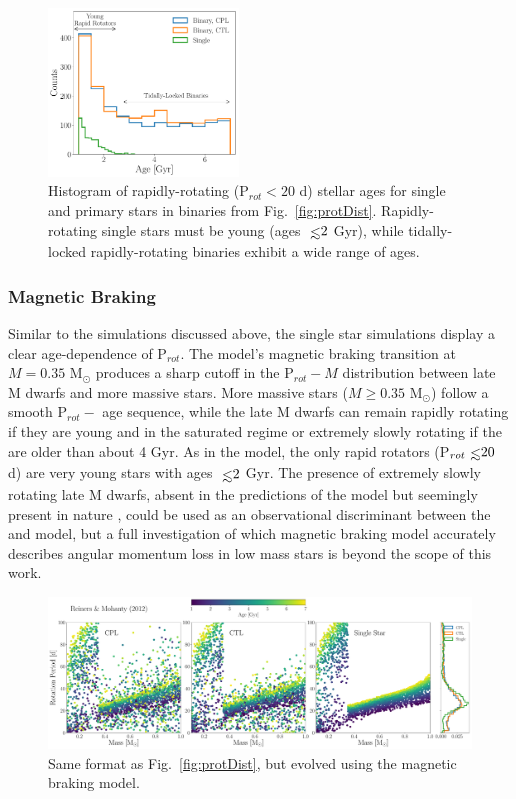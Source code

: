 \documentclass[twocolumn]{aastex61}
\def\lsim{~\rlap{$<$}{\lower 1.0ex\hbox{$\sim$}}}
\begin{document}
\begin{figure}[h]
	\includegraphics[width=0.45\textwidth]{../Plots/protAgeHist.pdf}
   \caption{Histogram of rapidly-rotating (P$_{rot} < 20$ d) stellar ages for single and primary stars in binaries from Fig.~\ref{fig:protDist}. Rapidly-rotating single stars must be young (ages $\lsim 2$ Gyr), while tidally-locked rapidly-rotating binaries exhibit a wide range of ages.}%
    \label{fig:protAgeHist}%
\end{figure}

\subsubsection{\citet{Reiners2012} Magnetic Braking}

Similar to the \citet{Matt2015} simulations discussed above, the single star simulations display a clear age-dependence of P$_{rot}$. The \citet{Reiners2012} model's magnetic braking transition at $M = 0.35$ M$_{\odot}$ produces a sharp cutoff in the P$_{rot} - M$ distribution between late M dwarfs and more massive stars.  More massive stars ($M \geq 0.35$ M$_{\odot}$) follow a smooth P$_{rot} -$ age sequence, while the late M dwarfs can remain rapidly rotating if they are young and in the saturated regime or extremely slowly rotating if the are older than about 4 Gyr. As in the \citet{Matt2015} model, the only rapid rotators (P$_{rot} \lsim 20$ d) are very young stars with ages $\lsim 2$ Gyr. The presence of extremely slowly rotating late M dwarfs, absent in the predictions of the \citet{Matt2015} model but seemingly present in nature \citep[e.g.][]{Newton2018}, could be used as an observational discriminant between the \citet{Matt2015} and \citet{Reiners2012} model, but a full investigation of which magnetic braking model accurately describes angular momentum loss in low mass stars is beyond the scope of this work. 

\begin{figure}[t]
	\includegraphics[width=\textwidth]{../Plots/protDistReiners.pdf}
   \caption{Same format as Fig.~\ref{fig:protDist}, but evolved using the \citet{Reiners2012} magnetic braking model.}%
    \label{fig:protDistReiners}%
\end{figure}
\end{document}
